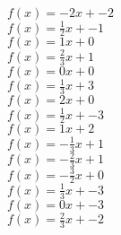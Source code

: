 \documentclass[12pt]{article}
\theoremstyle{note}
\begin{document}
\begin{flushleft}
$f(x)=-2x+-2$ \\ 
$f(x)=\frac{1}{2}x+-1$ \\ 
$f(x)=1x+0$ \\ 
$f(x)=\frac{2}{3}x+1$ \\ 
$f(x)=0x+0$ \\ 
$f(x)=\frac{1}{3}x+3$ \\ 
$f(x)=2x+0$ \\ 
$f(x)=\frac{1}{2}x+-3$ \\ 
$f(x)=1x+2$ \\ 
$f(x)=- \frac{1}{3}x+1$ \\ 
$f(x)=- \frac{2}{3}x+1$ \\ 
$f(x)=- \frac{3}{2}x+0$ \\ 
$f(x)=\frac{1}{3}x+-3$ \\ 
$f(x)=0x+-3$ \\ 
$f(x)=\frac{2}{3}x+-2$ \\ 
\end{flushleft}
\end{document}
